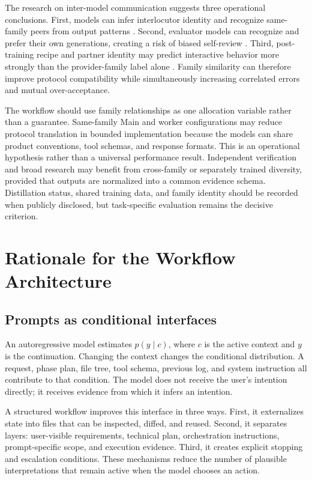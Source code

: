 \documentclass[11pt,a4paper]{article}
\begin{document}
The research on inter-model communication suggests three operational conclusions. First, models can infer interlocutor identity and recognize same-family peers from output patterns \cite{choi2025interlocutor}. Second, evaluator models can recognize and prefer their own generations, creating a risk of biased self-review \cite{panickssery2024}. Third, post-training recipe and partner identity may predict interactive behavior more strongly than the provider-family label alone \cite{zhang2026posttraining}. Family similarity can therefore improve protocol compatibility while simultaneously increasing correlated errors and mutual over-acceptance.

The workflow should use family relationships as one allocation variable rather than a guarantee. Same-family Main and worker configurations may reduce protocol translation in bounded implementation because the models can share product conventions, tool schemas, and response formats. This is an operational hypothesis rather than a universal performance result. Independent verification and broad research may benefit from cross-family or separately trained diversity, provided that outputs are normalized into a common evidence schema. Distillation status, shared training data, and family identity should be recorded when publicly disclosed, but task-specific evaluation remains the decisive criterion.

\section{Rationale for the Workflow Architecture}\label{sec:rationale}

\subsection{Prompts as conditional interfaces}\label{sec:conditional-interface}

An autoregressive model estimates $p(y\mid c)$, where $c$ is the active context and $y$ is the continuation. Changing the context changes the conditional distribution. A request, phase plan, file tree, tool schema, previous log, and system instruction all contribute to that condition. The model does not receive the user's intention directly; it receives evidence from which it infers an intention.

A structured workflow improves this interface in three ways. First, it externalizes state into files that can be inspected, diffed, and reused. Second, it separates layers: user-visible requirements, technical plan, orchestration instructions, prompt-specific scope, and execution evidence. Third, it creates explicit stopping and escalation conditions. These mechanisms reduce the number of plausible interpretations that remain active when the model chooses an action.
\end{document}
